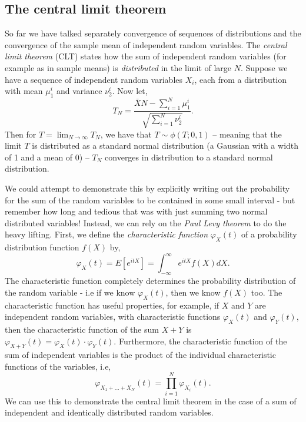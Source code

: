 \subsection{The central limit theorem}
So far we have talked separately convergence of sequences of  distributions and the convergence of the sample mean of independent random variables. The \emph{central limit theorem} (CLT) states how the sum of independent random variables (for example as in sample means) is \emph{distributed} in the limit of large $N$. 
Suppose we have a sequence of independent random variables $X_{i}$, each from a distribution with mean $\mu_{1}^{i}$ and variance $\nu_{2}^{i}$. Now let, 
\begin{equation}\label{eqn:clt}
   T_{N}= \dfrac{\bar{X}N - \sum_{i=1}^{N} \mu_{1}^{i}}{\sqrt{\sum_{i=1}^{N}\nu^{i}_{2}}}.
\end{equation}
Then for $T=\lim_{N\rightarrow \infty}T_{N}$, we have that $T\sim \phi(T;0,1)$ -- meaning that the limit $T$ is distributed as a standard normal distribution (a Gaussian with a width of 1 and a mean of 0) -- $T_{N}$ converges in distribution to a standard normal distribution. 

We could attempt to demonstrate this by explicitly writing out the probability for the sum of the random variables to be contained in some small interval - but remember how long and tedious that was with just summing two normal distributed variables! Instead, we can rely on the \emph{Paul Levy theorem} to do the heavy lifting. First, we define the \emph{characteristic function} $\varphi_{X}(t)$ of a probability distribution function $f(X)$  by, 
\begin{equation}
    \varphi_{X}(t)  = E\left[ e^{itX}\right] = \int_{-\infty}^{\infty} e^{itX}f(X)dX.
\end{equation}
The characteristic function completely determines the probability distribution of the random variable - i.e if we know $\varphi_{X}(t)$, then we know $f(X)$ too. The characteristic function has useful properties, for example, if $X$ and $Y$ are independent random variables, with characteristic functions  $\varphi_{X}(t)$ and $\varphi_{Y}(t)$, then the characteristic function of the sum $X+Y$ is $ \varphi_{X+Y}(t) =  \varphi_{X}(t) \cdot \varphi_{Y}(t) $. Furthermore, the characteristic function of the sum of independent variables is the product of the individual characteristic functions of the variables, i.e, 
\begin{equation}\label{eqn:prodcharacteristic}
    \varphi_{X_1+...+X_{N}}(t)  = \prod_{i=1}^{N}\varphi_{X_{i}}(t).
\end{equation}
We can use this to demonstrate the central limit theorem in the case of a sum of independent and identically distributed random variables. 

